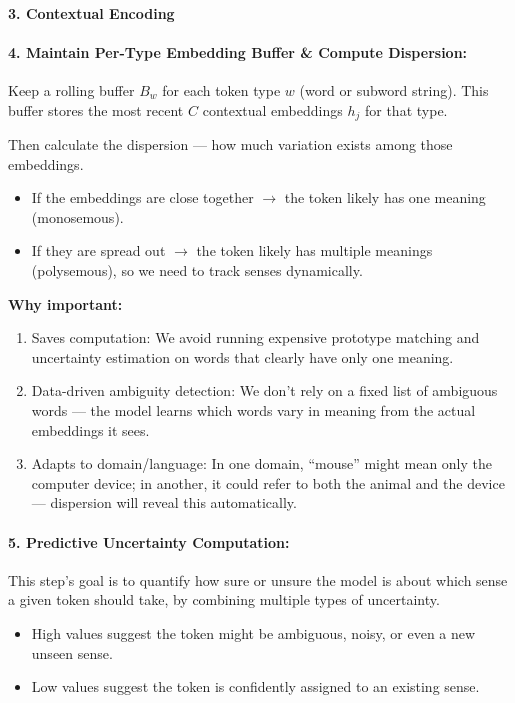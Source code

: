 \documentclass[a4paper,12pt]{article}
\begin{document}
\paragraph{3. Contextual Encoding}

\paragraph{4. Maintain Per-Type Embedding Buffer \& Compute Dispersion:}
Keep a rolling buffer $B_w$ for each token type $w$ (word or subword string). This buffer stores the most recent $C$ contextual embeddings $h_j$ for that type.

Then calculate the dispersion --- how much variation exists among those embeddings.

\begin{itemize}
    \item If the embeddings are close together $\rightarrow$ the token likely has one meaning (monosemous).
    \item If they are spread out $\rightarrow$ the token likely has multiple meanings (polysemous), so we need to track senses dynamically.
\end{itemize}

\textbf{Why important:}
\begin{enumerate}
    \item Saves computation: We avoid running expensive prototype matching and uncertainty estimation on words that clearly have only one meaning.
    \item Data-driven ambiguity detection: We don’t rely on a fixed list of ambiguous words --- the model learns which words vary in meaning from the actual embeddings it sees.
    \item Adapts to domain/language: In one domain, ``mouse'' might mean only the computer device; in another, it could refer to both the animal and the device --- dispersion will reveal this automatically.
\end{enumerate}

\paragraph{5. Predictive Uncertainty Computation:} This step’s goal is to quantify how sure or unsure the model is about which sense a given token should take, by combining multiple types of uncertainty.

\begin{itemize}
    \item High values suggest the token might be ambiguous, noisy, or even a new unseen sense.
    \item Low values suggest the token is confidently assigned to an existing sense.
\end{itemize}
\end{document}
